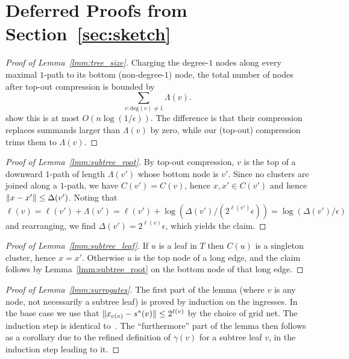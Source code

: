 \section{Deferred Proofs from Section~\ref{sec:sketch}}\label{sec:sketch_proofs}

\begin{proof}[Proof of Lemma~\ref{lmm:tree_size}]
Charging the degree-$1$ nodes along every maximal $1$-path to its bottom (non-degree-$1$) node,
the total number of nodes after top-out compression is bounded by
\[ \sum_{v:\mathrm{deg}(v)\neq1}\Lambda(v) . \]
\cite{indyk2017near} show this is at most $O(n\log(1/\epsilon))$.
The difference is that their compression replaces summands larger than $\Lambda(v)$ by zero, while our (top-out) compression trims them to $\Lambda(v)$.
\end{proof}


\begin{proof}[Proof of Lemma~\ref{lmm:subtree_root}]
By top-out compression, $v$ is the top of a downward $1$-path of length $\Lambda(v')$ whose bottom node is $v'$. Since no clusters are joined along a $1$-path, we have $C(v')=C(v)$, hence $x,x'\in C(v')$ and hence $\lVert x-x'\rVert \leq \Delta(v')$. 
Noting that $\ell(v)=\ell(v')+\Lambda(v')=\ell(v')+\log(\Delta(v')/(2^{\ell(v')}\epsilon))=\log(\Delta(v')/\epsilon)$ and rearranging, we find $\Delta(v')=2^{\ell(v)}\epsilon$, which yields the claim.
\end{proof}


\begin{proof}[Proof of Lemma~\ref{lmm:subtree_leaf}]
If $u$ is a leaf in $T$ then $C(u)$ is a singleton cluster, hence $x=x'$.
Otherwise $u$ is the top node of a long edge, and the claim follows by Lemma~\ref{lmm:subtree_root} on the bottom node of that long edge.
\end{proof}


\begin{proof}[Proof of Lemma~\ref{lmm:surrogates}]
The first part of the lemma (where $v$ is any node, not necessarily a subtree leaf) is proved by induction on the ingresses.
In the base case we use that $\lVert x_{c(v)}-s^*(v)\rVert\leq2^{\ell(v)}$ by the choice of grid net.
The induction step is identical to~\cite{indyk2017near}.
The ``furthermore'' part of the lemma then follows as a corollary due to the refined definition of $\gamma(v)$ for a subtree leaf $v$, in the induction step leading to it.
\end{proof}



